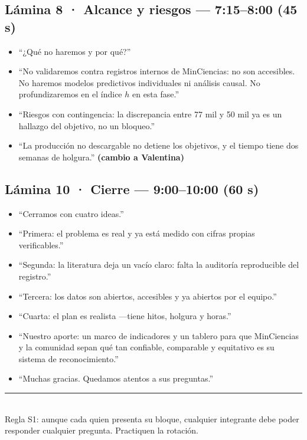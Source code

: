 \documentclass[10pt,a4paper]{article}
\newcommand{\tiempo}[1]{\textbf{\color{accent}#1}}
\begin{document}
\subsection{Lámina 8 · Alcance y riesgos — 7:15--8:00 (45 s)}
\begin{itemize}
  \item ``¿Qué no haremos y por qué?''
  \item ``No validaremos contra registros internos de MinCiencias: no son
        accesibles. No haremos modelos predictivos individuales ni análisis
        causal. No profundizaremos en el índice $h$ en esta fase.''
  \item ``Riesgos con contingencia: la discrepancia entre 77 mil y 50 mil ya es
        un hallazgo del objetivo, no un bloqueo.''
  \item ``La producción no descargable no detiene los objetivos, y el tiempo
        tiene dos semanas de holgura.'' \hfill \tiempo{(cambio a Valentina)}
\end{itemize}

\subsection{Lámina 10 · Cierre — 9:00--10:00 (60 s)}
\begin{itemize}
  \item ``Cerramos con cuatro ideas.''
  \item ``Primera: el problema es real y ya está medido con cifras propias
        verificables.''
  \item ``Segunda: la literatura deja un vacío claro: falta la auditoría
        reproducible del registro.''
  \item ``Tercera: los datos son abiertos, accesibles y ya abiertos por el
        equipo.''
  \item ``Cuarta: el plan es realista —tiene hitos, holgura y horas.''
  \item ``Nuestro aporte: un marco de indicadores y un tablero para que
        MinCiencias y la comunidad sepan qué tan confiable, comparable y
        equitativo es su sistema de reconocimiento.''
  \item ``Muchas gracias. Quedamos atentos a sus preguntas.''
\end{itemize}

\vfill
\begin{center}
{\color{gris}\rule{0.6\linewidth}{0.4pt}}\\[2mm]
{\small\color{gris} Regla S1: aunque cada quien presenta su bloque, cualquier
integrante debe poder responder cualquier pregunta. Practiquen la rotación.}
\end{center}
\end{document}
